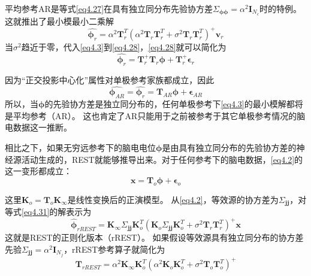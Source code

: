 平均参考AR是等式\eqref{eq4.27}在具有独立同分布先验协方差$\Sigma_{\mathbf{\phi\phi}}=\alpha^2\mathbf{I}_{N_c}$时的特例。 这就推出了最小模最小二乘解
\begin{equation}\label{eq4.28}
\hat{\mathbf{\phi}_r}=\alpha^2\mathbf{T}_r^T(\alpha^2\mathbf{T}_r\mathbf{T}_r^T+\sigma^2\mathbf{T}_r\mathbf{T}_r^T)^+\mathbf{v}_r
\end{equation}
当$\sigma^2$趋近于零，代入\eqref{eq4.3}到\eqref{eq4.28}，\eqref{eq4.28}就可以简化为
\begin{equation}\label{eq4.29}
\hat{\mathbf{\phi}_r}=\mathbf{T}_r^+\mathbf{T}_r\mathbf{\phi}+\mathbf{T}_r^+\mathbf{\epsilon}_r
\end{equation}

因为“正交投影中心化”属性对单极参考家族都成立，因此
\begin{equation}\label{eq4.30}
\hat{\mathbf{\phi}_{AR}}=\hat{\mathbf{\phi}_r}=\mathbf{T}_{AR}\mathbf{\phi}+\mathbf{\epsilon}_{AR}
\end{equation}
所以，当$\mathbf{\phi}$的先验协方差是独立同分布的，任何单极参考下\eqref{eq4.3}的最小模解都将是平均参考（AR）。 这也肯定了AR只能用于之前被参考于其它单极参考情况的脑电数据这一推断。

相比之下，如果无穷远参考下的脑电电位$\mathbf{\phi}$是由具有独立同分布的先验协方差的神经源活动生成的，REST就能够推导出来。对于任何参考下的脑电数据，\eqref{eq4.2}的这一变形都成立：
\begin{equation}\label{eq4.31}
\mathbf{x}=\mathbf{T}_o\mathbf{\phi}+\mathbf{\epsilon}_o
\end{equation}


这里$\mathbf{K}_o=\mathbf{T}_o\mathbf{K}_{\infty}$是线性变换后的正演模型。 从\eqref{eq4.2}，等效源的协方差为$\Sigma_{\mathbf{jj}}$，对等式\eqref{eq4.31}的解表示为
\begin{equation}\label{eq4.32}
\hat{\mathbf{\phi}}_{rREST}=\mathbf{K}_{\infty}\Sigma_{\mathbf{jj}}\mathbf{K}_o^T(\mathbf{K}_o\Sigma_{\mathbf{jj}}\mathbf{K}_o^T+\sigma^2\mathbf{T}_r\mathbf{T}_r^T)^+\mathbf{x}
\end{equation}
这就是REST的正则化版本（rREST）。 如果假设等效源具有独立同分布的协方差先验$\Sigma_\mathbf{jj}=\alpha^2\mathbf{I}_{N_j}$，rREST参考算子就简化为
\begin{equation}\label{eq4.33}
\mathbf{T}_{rREST}=\alpha^2\mathbf{K}_{\infty}\mathbf{K}_o^T(\alpha^2\mathbf{K}_o\mathbf{K}_o^T+\sigma^2\mathbf{T}_o\mathbf{T}_o^T)^+
\end{equation}

